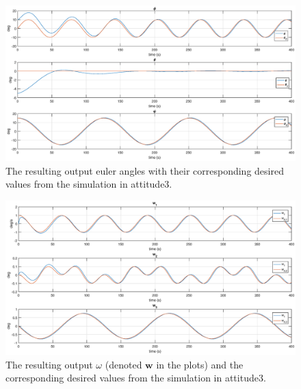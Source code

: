 \begin{figure}[htb]
	\centering
	\includegraphics[width=1.00\textwidth]{figures/3_euler.eps}
	\caption{The resulting output euler angles with their corresponding desired values from the simulation in attitude3.}
\label{fig:sim_attitude3_euler}
\end{figure}

\begin{figure}[htb]
	\centering
	\includegraphics[width=1.00\textwidth]{figures/3_omega.eps}
	\caption{The resulting output $\omega$ (denoted $\mathbf{w}$ in the plots) and the corresponding desired values from the simulation in attitude3.}
\label{fig:sim_attitude3_omega}
\end{figure}

